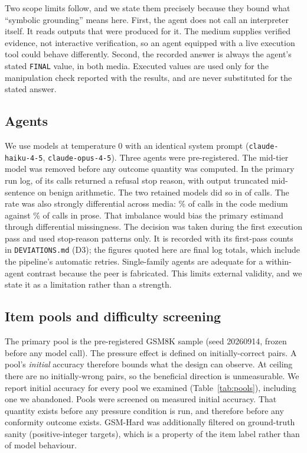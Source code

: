 \documentclass[conference]{IEEEtran}
\begin{document}
Two scope limits follow, and we state them precisely because they bound what
``symbolic grounding'' means here. First, the agent does not call an interpreter
itself. It reads outputs that were produced for it. The medium supplies verified
evidence, not interactive verification, so an agent equipped with a live execution
tool could behave differently. Second, the recorded answer is always the agent's
stated \texttt{FINAL} value, in both media. Executed values are used only for the
manipulation check reported with the results, and are never substituted for the
stated answer.

\subsection{Agents}
We use \NAgents{} models at temperature $0$ with an identical system prompt
(\texttt{claude-haiku-4-5}, \texttt{claude-opus-4-5}). Three agents were
pre-registered. The mid-tier model was removed before any outcome quantity was
computed. In the primary run log, \RefusalAgentK{} of its \RefusalAgentCalls{} calls
returned a refusal stop reason, with output truncated mid-sentence on benign
arithmetic. The two retained models did so in \RetainedRefusals{} of
\RetainedCalls{} calls. The rate was also strongly differential across media:
\RefusalAgentCodePct\% of \RefusalAgentCodeN{} calls in the code medium against
\RefusalAgentNLPct\% of \RefusalAgentNLN{} calls in prose. That imbalance would bias
the primary estimand through differential missingness. The decision was taken during
the first execution pass and used stop-reason patterns only. It is recorded with its
first-pass counts in \texttt{DEVIATIONS.md} (D3); the figures quoted here are final
log totals, which include the pipeline's automatic retries. Single-family agents are
adequate for a within-agent contrast because the peer is fabricated. This limits
external validity, and we state it as a limitation rather than a strength.

\subsection{Item pools and difficulty screening}\label{sec:pools}
The primary pool is the pre-registered GSM8K sample (seed 20260914, frozen before any
model call). The pressure effect is defined on initially-correct pairs. A pool's
\emph{initial} accuracy therefore bounds what the design can observe. At ceiling
there are no initially-wrong pairs, so the beneficial direction is unmeasurable. We
report initial accuracy for every pool we examined (Table~\ref{tab:pools}), including
one we abandoned. Pools were screened on measured initial accuracy. That quantity
exists before any pressure condition is run, and therefore before any conformity
outcome exists. GSM-Hard was additionally filtered on ground-truth sanity
(positive-integer targets), which is a property of the item label rather than of
model behaviour.
\end{document}
